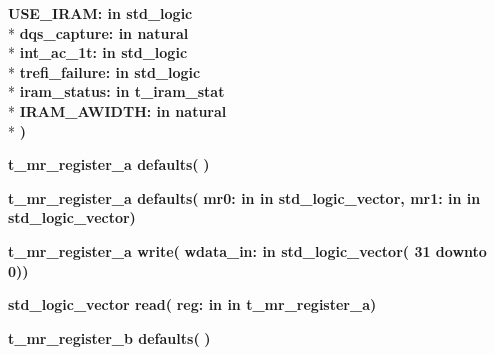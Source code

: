 \begin{DoxyCompactItemize}
{\bfseries \textcolor{vhdlchar}{U\+S\+E\+\_\+\+I\+R\+A\+M\+: }\textcolor{stringliteral}{in }{\bfseries \textcolor{comment}{std\+\_\+logic}\textcolor{vhdlchar}{ }}}\\*
{\bfseries \textcolor{vhdlchar}{dqs\+\_\+capture\+: }\textcolor{stringliteral}{in }{\bfseries \textcolor{comment}{natural}\textcolor{vhdlchar}{ }}}\\*
{\bfseries \textcolor{vhdlchar}{int\+\_\+ac\+\_\+1t\+: }\textcolor{stringliteral}{in }{\bfseries \textcolor{comment}{std\+\_\+logic}\textcolor{vhdlchar}{ }}}\\*
{\bfseries \textcolor{vhdlchar}{trefi\+\_\+failure\+: }\textcolor{stringliteral}{in }{\bfseries \textcolor{comment}{std\+\_\+logic}\textcolor{vhdlchar}{ }}}\\*
{\bfseries \textcolor{vhdlchar}{iram\+\_\+status\+: }\textcolor{stringliteral}{in }\textcolor{vhdlchar}{t\+\_\+iram\+\_\+stat}}\\*
{\bfseries \textcolor{vhdlchar}{I\+R\+A\+M\+\_\+\+A\+W\+I\+D\+T\+H\+: }\textcolor{stringliteral}{in }{\bfseries \textcolor{comment}{natural}\textcolor{vhdlchar}{ }}}\\*
{\bfseries  )} 
\item 
{\bfseries {\bfseries \textcolor{vhdlchar}{t\+\_\+mr\+\_\+register\+\_\+a}\textcolor{vhdlchar}{ }}} {\bf defaults}{\bfseries  ( }{\bfseries  )} 
\item 
{\bfseries {\bfseries \textcolor{vhdlchar}{t\+\_\+mr\+\_\+register\+\_\+a}\textcolor{vhdlchar}{ }}} {\bf defaults}{\bfseries  ( }{\bfseries \textcolor{vhdlchar}{mr0\+: }\textcolor{stringliteral}{in }\textcolor{vhdlchar}{in std\+\_\+logic\+\_\+vector}}{\bfseries  , \textcolor{vhdlchar}{mr1\+: }\textcolor{stringliteral}{in }\textcolor{vhdlchar}{in std\+\_\+logic\+\_\+vector}}{\bfseries  )} 
\item 
{\bfseries {\bfseries \textcolor{vhdlchar}{t\+\_\+mr\+\_\+register\+\_\+a}\textcolor{vhdlchar}{ }}} {\bf write}{\bfseries  ( }{\bfseries \textcolor{vhdlchar}{wdata\+\_\+in\+: }\textcolor{stringliteral}{in }\textcolor{vhdlchar}{std\+\_\+logic\+\_\+vector( 31 downto  0)}}{\bfseries  )} 
\item 
{\bfseries {\bfseries \textcolor{comment}{std\+\_\+logic\+\_\+vector}\textcolor{vhdlchar}{ }}} {\bf read}{\bfseries  ( }{\bfseries \textcolor{vhdlchar}{reg\+: }\textcolor{stringliteral}{in }\textcolor{vhdlchar}{in t\+\_\+mr\+\_\+register\+\_\+a}}{\bfseries  )} 
\item 
{\bfseries {\bfseries \textcolor{vhdlchar}{t\+\_\+mr\+\_\+register\+\_\+b}\textcolor{vhdlchar}{ }}} {\bf defaults}{\bfseries  ( }{\bfseries  )} 

\end{DoxyCompactItemize}
